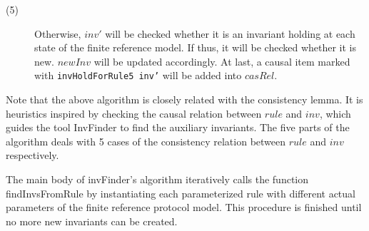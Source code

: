 \documentclass{llncs}
\begin{document}
\begin{description}
    \item[(5)] Otherwise, $inv'$ will be checked whether it is an invariant holding at each state of the finite reference model. If thus, it
    will be checked whether it is new. $newInv$ will be updated
    accordingly. At last, a causal item marked with {\tt invHoldForRule5
    inv'} will be added into $casRel$.
 \end{description}

Note that the above algorithm is closely related with the
consistency lemma. It is heuristics inspired by checking the causal
relation between $rule$ and $inv$,  which guides the tool {\sf
InvFinder} to find the auxiliary invariants. The five parts of the
algorithm deals with 5 cases of the consistency relation between
$rule$ and $inv$ respectively.

The main body of {\sf invFinder}'s algorithm iteratively calls the function
{\sf findInvsFromRule}  by instantiating each parameterized rule
with different actual parameters of the finite reference protocol
model. This procedure is  finished until no more new invariants can be created.


\end{document}
